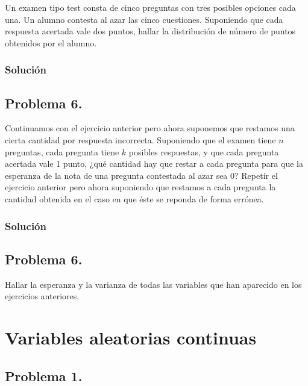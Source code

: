 \documentclass[]{article}
\begin{document}
{{Un examen tipo test consta de cinco preguntas con tres posibles opciones
cada una. Un alumno contesta al azar las cinco cuestiones. Suponiendo
que cada respuesta acertada vale dos puntos, hallar la distribución de
número de puntos obtenidos por el alumno.

\hypertarget{soluciuxf3n-4}{%
\subsubsection{Solución}\label{soluciuxf3n-4}}

\hypertarget{problema-6.}{%
\subsection{Problema 6.}\label{problema-6.}}

Continuamos con el ejercicio anterior pero ahora suponemos que restamos
una cierta cantidad por respuesta incorrecta. Suponiendo que el examen
tiene \(n\) preguntas, cada pregunta tiene \(k\) posibles respuestas, y
que cada pregunta acertada vale 1 punto, ¿qué cantidad hay que restar a
cada pregunta para que la esperanza de la nota de una pregunta
contestada al azar sea 0? Repetir el ejercicio anterior pero ahora
suponiendo que restamos a cada pregunta la cantidad obtenida en el caso
en que éste se reponda de forma errónea.

\hypertarget{soluciuxf3n-5}{%
\subsubsection{Solución}\label{soluciuxf3n-5}}

\hypertarget{problema-6.-1}{%
\subsection{Problema 6.}\label{problema-6.-1}}

Hallar la esperanza y la varianza de todas las variables que han
aparecido en los ejercicios anteriores.

\hypertarget{variables-aleatorias-continuas}{%
\section{Variables aleatorias
continuas}\label{variables-aleatorias-continuas}}

\hypertarget{problema-1.-1}{%
\subsection{Problema 1.}\label{problema-1.-1}}

}}
\end{document}
